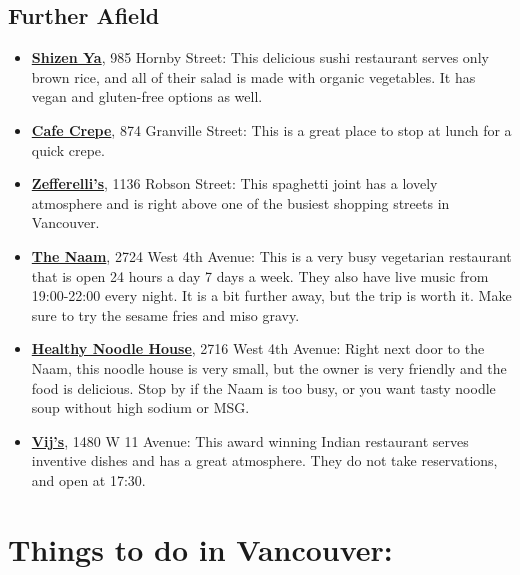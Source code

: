 \documentclass[letterpaper,12pt]{article}
\begin{document}
\subsection*{Further Afield}
\begin{itemize}
\setlength{\itemsep}{0pt}
\item \href{http://www.shizenya.ca}{\textbf{Shizen Ya}}, 985 Hornby Street: This delicious sushi restaurant serves only brown rice, and all of their salad is made with organic vegetables. It has vegan and gluten-free options as well.
\item \href{http://www.cafecrepe.com}{\textbf{Cafe Crepe}}, 874 Granville Street: This is a great place to stop at lunch for a quick crepe.
\item \href{http://www.zefferellis.com}{\textbf{Zefferelli's}}, 1136 Robson Street: This spaghetti joint has a lovely atmosphere and is right above one of the busiest shopping streets in Vancouver.
\item \href{http://www.thenaam.com}{\textbf{The Naam}}, 2724 West 4th Avenue: This is a very busy vegetarian restaurant that is open 24 hours a day 7 days a week. They also have live music from 19:00-22:00 every night. It is a bit further away, but the trip is worth it. Make sure to try the sesame fries and miso gravy.	
\item \href{http://www.healthynoodle.ca}{\textbf{Healthy Noodle House}}, 2716 West 4th Avenue: Right next door to the Naam, this noodle house is very small, but the owner is very friendly and the food is delicious. Stop by if the Naam is too busy, or you want tasty noodle soup without high sodium or MSG.
\item \href{http://www.vijsrestaurant.ca}{\textbf{Vij's}}, 1480 W 11 Avenue: This award winning Indian restaurant serves inventive dishes and has a great atmosphere. They do not take reservations, and open at 17:30.
\end{itemize}


\section*{Things to do in Vancouver:}
\end{document}
